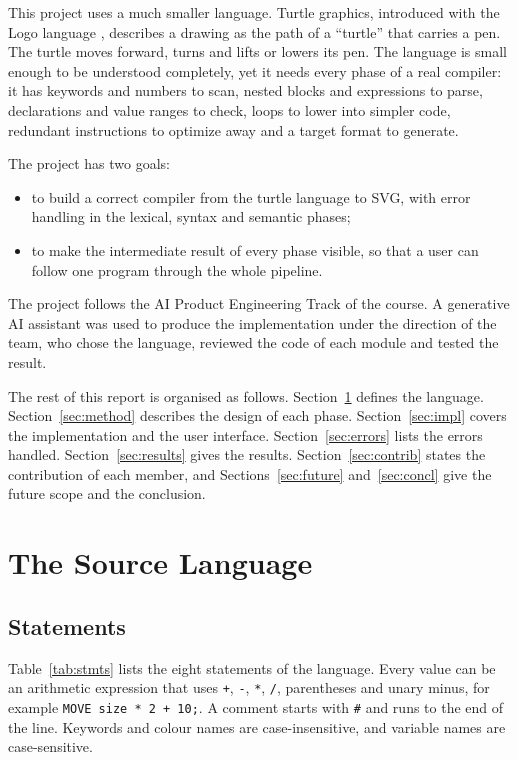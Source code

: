 \documentclass[conference]{IEEEtran}
\newcommand{\kw}[1]{\texttt{#1}}
\begin{document}
This project uses a much smaller language. Turtle graphics, introduced with the Logo language \cite{papert}, describes a drawing as the path of a ``turtle'' that carries a pen. The turtle moves forward, turns and lifts or lowers its pen. The language is small enough to be understood completely, yet it needs every phase of a real compiler: it has keywords and numbers to scan, nested blocks and expressions to parse, declarations and value ranges to check, loops to lower into simpler code, redundant instructions to optimize away and a target format to generate.

The project has two goals:
\begin{itemize}
\item to build a correct compiler from the turtle language to SVG, with error handling in the lexical, syntax and semantic phases;
\item to make the intermediate result of every phase visible, so that a user can follow one program through the whole pipeline.
\end{itemize}

The project follows the AI Product Engineering Track of the course. A generative AI assistant was used to produce the implementation under the direction of the team, who chose the language, reviewed the code of each module and tested the result.

The rest of this report is organised as follows. Section~\ref{sec:lang} defines the language. Section~\ref{sec:method} describes the design of each phase. Section~\ref{sec:impl} covers the implementation and the user interface. Section~\ref{sec:errors} lists the errors handled. Section~\ref{sec:results} gives the results. Section~\ref{sec:contrib} states the contribution of each member, and Sections~\ref{sec:future} and~\ref{sec:concl} give the future scope and the conclusion.

\section{The Source Language}\label{sec:lang}

\subsection{Statements}
Table~\ref{tab:stmts} lists the eight statements of the language. Every value can be an arithmetic expression that uses \kw{+}, \kw{-}, \kw{*}, \kw{/}, parentheses and unary minus, for example \kw{MOVE size * 2 + 10;}. A comment starts with \kw{\#} and runs to the end of the line. Keywords and colour names are case-insensitive, and variable names are case-sensitive.
\end{document}
